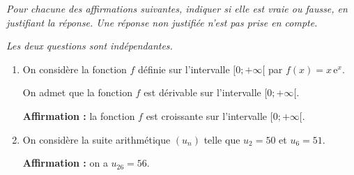 \emph{Pour chacune des affirmations suivantes, indiquer si elle est vraie ou fausse, en justifiant la réponse. Une réponse non justifiée n'est pas prise en compte.}

\emph{Les deux questions sont indépendantes.}

\begin{enumerate}
	\item On considère la fonction $f$ définie sur l'intervalle $[0 ; +\infty[$ par $f(x) = x\,\mathrm{e}^x$.

	On admet que la fonction $f$ est dérivable sur l'intervalle $[0 ; +\infty[$.

	\textbf{Affirmation :} la fonction $f$ est croissante sur l'intervalle $[0 ; +\infty[$.

	\item On considère la suite arithmétique $\left(u_n\right)$ telle que $u_2=50$ et $u_6=51$.

	\textbf{Affirmation :} on a $u_{26}=56$.
\end{enumerate}
